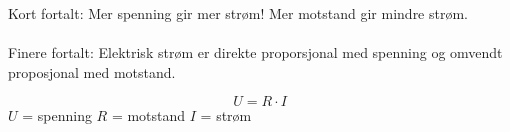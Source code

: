 Kort fortalt: Mer spenning gir mer strøm! Mer motstand gir mindre strøm.
\\\\
Finere fortalt: Elektrisk strøm er direkte proporsjonal med spenning og omvendt proposjonal med motstand.

$$U = R \cdot I$$
$U$ = spenning \qquad $R$ = motstand \qquad $I$ = strøm
